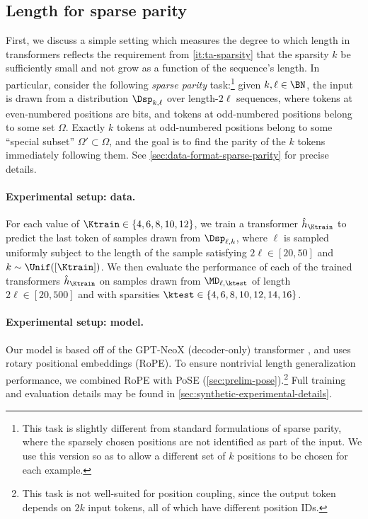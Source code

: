 \documentclass{article}
\begin{document}
\subsection{Length \generalization for sparse parity}
\label{sec:sparse-parity}


First, we discuss a simple setting which measures the degree to which length \generalization in transformers reflects the requirement from \ref{it:ta-sparsity} that the sparsity $k$ be sufficiently small and not grow as a function of the sequence's length. In particular, consider the following \emph{sparse parity} task:\footnote{This task is slightly different from standard formulations of sparse parity, where the sparsely chosen positions are not identified as part of the input. We use this version so as to allow a different set of $k$ positions to be chosen for each example.} given $k ,\ell\in \BN$, the input is drawn from a distribution $\Dsp_{k,\ell}$ over length-$2\ell$ sequences, where tokens at even-numbered positions are bits, and tokens at odd-numbered positions belong to some set $\Omega$. Exactly $k$ tokens at odd-numbered positions belong to some ``special subset'' $\Omega' \subset \Omega$, and the goal is to find the parity of the $k$ tokens immediately following them. See \cref{sec:data-format-sparse-parity} for precise details. 


\paragraph{Experimental setup: data.} For each value of ${\Ktrain} \in {\{4,6,8,10,12\}}$, we train a transformer $\hat h_{\Ktrain}$ to predict the last token of samples drawn from $\Dsp_{\ell, k}$, where $\ell$ is sampled uniformly subject to the length of the sample satisfying {$2\ell \in [20, 50]$} and $k \sim \Unif([{\Ktrain}])$. We then evaluate the performance of each of the trained transformers $\hat h_{\Ktrain}$ on samples drawn from $\MD_{\ell, \ktest}$ of length {$2\ell \in [20, 500]$} and with sparsities $\ktest \in \{4,6,8,10,12,14,16\}$. 


\paragraph{Experimental setup: model.} Our model is based off of the GPT-NeoX (decoder-only) transformer \cite{gpt-neox-library}, and uses rotary positional embeddings (RoPE). %
To ensure nontrivial length generalization performance, we combined RoPE with PoSE (\cref{sec:prelim-pose}).\footnote{This task is not well-suited for position coupling, since the output token depends on $2k$ input tokens, all of which have different position IDs.} Full training and evaluation details may be found in \cref{sec:synthetic-experimental-details}.  %
\end{document}
